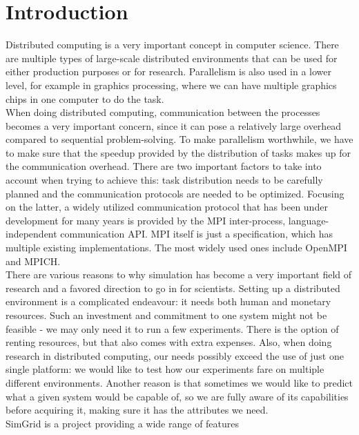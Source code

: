 
\chapter{Introduction}
\label{Chapter1}

Distributed computing is a very important concept in computer
science. There are multiple types of large-scale distributed
environments that can be used for either production purposes or for
research. Parallelism is also used in a lower level, for example in
graphics processing, where we can have multiple graphics chips in one
computer to do the task.\\
When doing distributed computing, communication between the processes
becomes a very important concern, since it can pose a relatively large
overhead compared to sequential problem-solving. To make parallelism
worthwhile, we have to make sure that the speedup provided by the
distribution of tasks makes up for the communication overhead. There
are two important factors to take into account when trying to
achieve this: task distribution needs to be carefully planned and the
communication protocols are needed to be optimized. Focusing on the
latter, a widely utilized
communication protocol that has been under development for many years
is provided by the MPI\cite{mpif12} inter-process, language-independent
communication API. MPI itself is just a specification, which has
multiple existing implementations. The most widely used
ones include OpenMPI\cite{ompi04} and MPICH\cite{mpich12}.\\
There are various reasons to why simulation has become a very
important field of research and a favored direction to go in for
scientists. Setting up a distributed environment is a complicated
endeavour: it needs both human and monetary resources. Such an
investment and commitment to one system might not be feasible - we may
only need it to run a few experiments. There is the option of renting
resources, but that also comes with extra expenses. Also, when doing
research in distributed computing, our needs possibly exceed the use
of just one single platform: we would like to test how our experiments
fare on multiple different environments. Another reason is that
sometimes we would like to predict what a given system would be
capable of, so we are fully aware of its capabilities before acquiring
it, making sure it has the attributes we need.\\
SimGrid\cite{clq08} is a project providing a wide range of features
